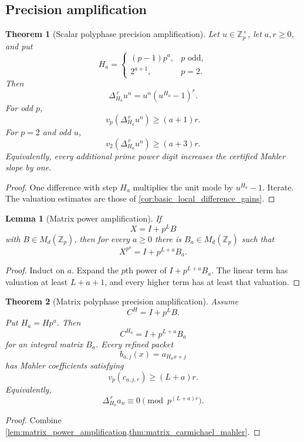 \documentclass{aomart}
\newtheorem{theorem}{Theorem}[section]
\newtheorem{lemma}[lemma]{Lemma}
\theoremstyle{definition}
\theoremstyle{remark}
\newcommand{\Zp}{\mathbb Z_p}
\newcommand{\vp}{v_p}
\newcommand{\vTwo}{v_2}
\begin{document}
\subsection{Precision amplification}

\begin{theorem}[Scalar polyphase precision amplification]\label{thm:scalar_polyphase_precision}
Let \(u\in\mathbb Z_p^\times\), let \(a,r\geq0\), and put
\[
H_a=
\begin{cases}
(p-1)p^a,&p\text{ odd},\\
2^{a+1},&p=2.
\end{cases}
\]
Then
\[
\boxed{
\Delta_{H_a}^{\,r}u^n
=
u^n\left(u^{H_a}-1\right)^r.
}
\]
For odd \(p\),
\[
\boxed{
\vp\left(\Delta_{H_a}^{\,r}u^n\right)
\geq(a+1)r.
}
\]
For \(p=2\) and odd \(u\),
\[
\boxed{
\vTwo\left(\Delta_{H_a}^{\,r}u^n\right)
\geq(a+3)r.
}
\]
Equivalently, every additional prime power digit increases the certified Mahler slope by one.
\end{theorem}

\begin{proof}
One difference with step \(H_a\) multiplies the unit mode by \(u^{H_a}-1\). Iterate. The valuation estimates are those of \cref{cor:basic_local_difference_gains}.
\end{proof}

\begin{lemma}[Matrix power amplification]\label{lem:matrix_power_amplification}
If
\[
X=I+p^LB
\]
with \(B\in M_d(\Zp)\), then for every \(a\geq0\) there is \(B_a\in M_d(\Zp)\) such that
\[
\boxed{X^{p^a}=I+p^{L+a}B_a.}
\]
\end{lemma}

\begin{proof}
Induct on \(a\). Expand the \(p\)th power of \(I+p^{L+a}B_a\). The linear term has valuation at least \(L+a+1\), and every higher term has at least that valuation.
\end{proof}

\begin{theorem}[Matrix polyphase precision amplification]\label{thm:matrix_polyphase_precision}
Assume
\[
C^H=I+p^LB.
\]
Put \(H_a=Hp^a\). Then
\[
C^{H_a}=I+p^{L+a}B_a
\]
for an integral matrix \(B_a\). Every refined packet
\[
b_{a,j}(x)=a_{H_ax+j}
\]
has Mahler coefficients satisfying
\[
\boxed{\vp(c_{a,j,r})\geq(L+a)r.}
\]
Equivalently,
\[
\boxed{
\Delta_{H_a}^{\,r}a_n
\equiv0
\pmod {p^{(L+a)r}}.
}
\]
\end{theorem}

\begin{proof}
Combine \cref{lem:matrix_power_amplification,thm:matrix_carmichael_mahler}.
\end{proof}
\end{document}
